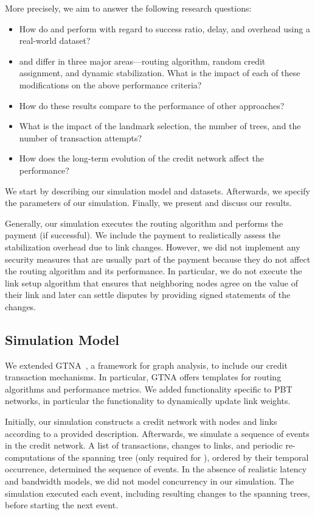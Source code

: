More precisely, we aim to answer the following research questions:
\begin{itemize}%
\item How do \oursys and \cnsysname perform with regard to success ratio, delay, and overhead using a real-world dataset?
\item \oursys and \cnsysname differ in three major areas---routing algorithm, random credit assignment, and dynamic stabilization.  What is the impact of each of these modifications on the above performance criteria?
\item How do these results compare to the performance of other approaches? 
\item What is the impact of the landmark selection, the number of trees, and the number of transaction attempts?
\item How does the long-term evolution of the credit network affect the performance? 
\end{itemize}

We start by describing our simulation model and datasets. Afterwards, we specify the parameters of our simulation. 
Finally, we present and discuss our results. 

Generally, our simulation executes the routing algorithm and performs the payment (if successful). 
We include the payment to realistically assess the stabilization overhead due to link changes.  
However, we did not implement any security measures that are usually part of the payment because they do not affect the routing algorithm and its performance. 
In particular, we do not execute the link setup algorithm that ensures that neighboring nodes agree on the value of their link and later can settle disputes by providing signed statements of the changes. 

\subsection{Simulation Model}

We extended GTNA~\cite{schiller2013gtna}, a framework for graph analysis, to include our credit transaction mechanisms.
In particular, GTNA offers templates for routing algorithms and performance metrics.
We added functionality specific to PBT networks, in particular the functionality to dynamically update link weights.

Initially, our simulation constructs a credit network with nodes and links according to a provided description. 
Afterwards, we simulate a sequence of events in the credit network.
A list of transactions, changes to links, and periodic re-computations of the spanning tree (only required for \cnsysname), ordered
by their temporal occurrence, determined the sequence of events. 
In the absence of realistic latency and bandwidth models, we did not model concurrency in our simulation.
The simulation executed each event, including resulting changes to the spanning trees, before starting the next event.

